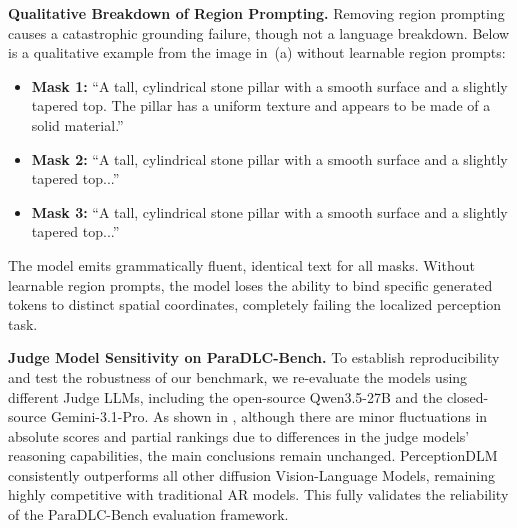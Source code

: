 \documentclass{llmxive}
\begin{document}
\noindent
\textbf{Qualitative Breakdown of Region Prompting.}
Removing region prompting causes a catastrophic grounding failure, though not a language breakdown. Below is a qualitative example from the image in~(a) without learnable region prompts:
\begin{itemize}
    \item \textbf{Mask 1:} ``A tall, cylindrical stone pillar with a smooth surface and a slightly tapered top. The pillar has a uniform texture and appears to be made of a solid material.''
    \item \textbf{Mask 2:} ``A tall, cylindrical stone pillar with a smooth surface and a slightly tapered top...''
    \item \textbf{Mask 3:} ``A tall, cylindrical stone pillar with a smooth surface and a slightly tapered top...''
\end{itemize}
The model emits grammatically fluent, identical text for all masks. Without learnable region prompts, the model loses the ability to bind specific generated tokens to distinct spatial coordinates, completely failing the localized perception task.

\noindent
\textbf{Judge Model Sensitivity on ParaDLC-Bench.}
To establish reproducibility and test the robustness of our benchmark, we re-evaluate the models using different Judge LLMs, including the open-source Qwen3.5-27B and the closed-source Gemini-3.1-Pro. As shown in , although there are minor fluctuations in absolute scores and partial rankings due to differences in the judge models' reasoning capabilities, the main conclusions remain unchanged. PerceptionDLM consistently outperforms all other diffusion Vision-Language Models, remaining highly competitive with traditional AR models. This fully validates the reliability of the ParaDLC-Bench evaluation framework.
\end{document}

